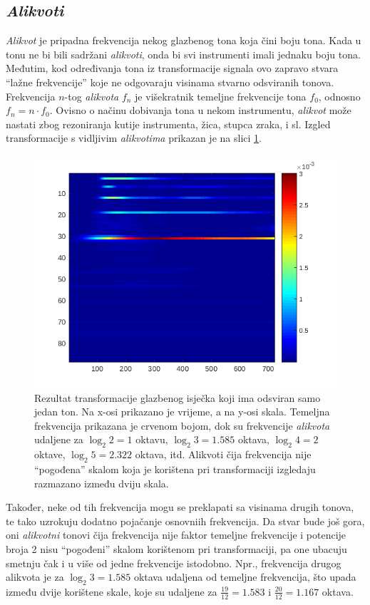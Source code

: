 \documentclass[a4paper, 10pt, twocolumn]{article}
\begin{document}
\subsection{\textit{Alikvoti}}
\label{ss:alikvoti}
\textit{Alikvot} je pripadna frekvencija nekog glazbenog tona koja čini boju tona.
Kada u tonu ne bi bili sadržani \textit{alikvoti}, onda bi svi instrumenti imali jednaku boju tona.
Međutim, kod određivanja tona iz transformacije signala ovo zapravo stvara ``lažne frekvencije'' koje ne odgovaraju visinama stvarno odsviranih tonova.
Frekvencija $n$-tog \textit{alikvota} $f_n$ je višekratnik temeljne frekvencije tona $f_0$, odnosno $f_n = n \cdot f_0$.
Ovisno o načinu dobivanja tona u nekom instrumentu, \textit{alikvot} može nastati zbog rezoniranja kutije instrumenta, žica, stupca zraka, i sl.
Izgled transformacije s vidljivim \textit{alikvotima} prikazan je na slici \ref{fig:alikvoti}.

\begin{figure}[htb]
  \includegraphics[width=\linewidth]{alikvoti}
  \caption{Rezultat transformacije glazbenog isječka koji ima odsviran samo jedan ton. Na x-osi prikazano je vrijeme, a na y-osi skala. Temeljna frekvencija prikazana je crvenom bojom, dok su frekvencije \textit{alikvota} udaljene za $\log_2{2}=1$ oktavu, $\log_2{3}=1.585$ oktava, $\log_2{4}=2$ oktave, $\log_2{5}=2.322$ oktava, itd. Alikvoti čija frekvencija nije ``pogođena'' skalom koja je korištena pri transformaciji izgledaju razmazano između dviju skala.}
  \label{fig:alikvoti}
\end{figure}

Također, neke od tih frekvencija mogu se preklapati sa visinama drugih tonova, te tako uzrokuju dodatno pojačanje osnovniih frekvencija.
Da stvar bude još gora, oni \textit{alikvotni} tonovi čija frekvencija nije faktor temeljne frekvencije i potencije broja 2 nisu ``pogođeni'' skalom korištenom pri transformaciji, pa one ubacuju smetnju čak i u više od jedne frekvencije istodobno.
Npr., frekvencija drugog alikvota je za $\log_2{3}=1.585$ oktava udaljena od temeljne frekvencija, što upada između dvije korištene skale, koje su udaljene za $\frac{19}{12}=1.583$ i $\frac{20}{12}=1.167$ oktava.
\end{document}
